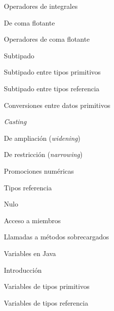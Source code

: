 \begin{longenum}
\begin{longenum}
\begin{longenum}
\begin{longenum}
\begin{longenum}
                    \item Operadores de integrales
                \end{longenum}
                \item De coma flotante
                \begin{longenum}
                    \item Operadores de coma flotante
                \end{longenum}
                \item Subtipado
                \begin{longenum}
                    \item Subtipado entre tipos primitivos
                    \item Subtipado entre tipos referencia
                \end{longenum}
                \item Conversiones entre datos primitivos
                \begin{longenum}
                    \item \textit{Casting}
                    \item De ampliación (\textit{widening})
                    \item De restricción (\textit{narrowing})
                \end{longenum}
                \item Promociones numéricas
            \end{longenum}
            \item Tipos referencia
            \begin{longenum}
                \item Nulo
                \item Acceso a miembros
                \begin{longenum}
                    \item Llamadas a métodos sobrecargados
                \end{longenum}
            \end{longenum}
        \end{longenum}
        \item Variables en Java
        \begin{longenum}
            \item Introducción
            \item Variables de tipos primitivos
            \item Variables de tipos referencia

\end{longenum}
\end{longenum}
\end{longenum}
